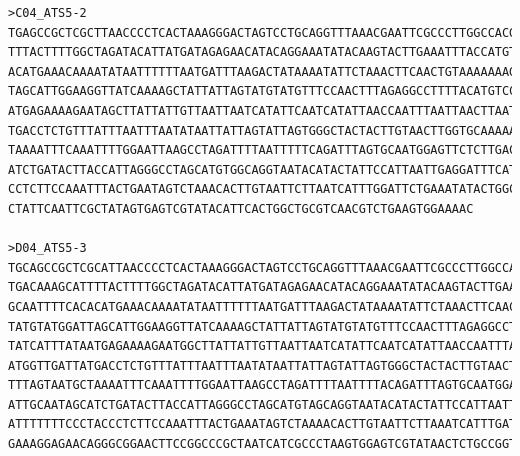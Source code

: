\begin{verbatim}
>C04_ATS5-2
TGAGCCGCTCGCTTAACCCCTCACTAAAGGGACTAGTCCTGCAGGTTTAAACGAATTCGCCCTTGGCCACGCGTCGACTAGTACTTTTTTTTTTTTTTTTTTTTTAAGGTGACAAAGCAT
TTTACTTTTGGCTAGATACATTATGATAGAGAACATACAGGAAATATACAAGTACTTGAAATTTACCATGTTACATTAGAAATTATGGACATAGACATTTAAGTTTTATGCAATTTTCAC
ACATGAAACAAAATATAATTTTTTAATGATTTAAGACTATAAAATATTCTAAACTTCAACTGTAAAAAAAGTAGATTTGACACATGAGGTATGATTTAGTGACCAGTCCTATGTATGGAT
TAGCATTGGAAGGTTATCAAAAGCTATTATTAGTATGTATGTTTCCAACTTTAGAGGCCTTTTACATGTCCTTAATGAATTTATATGCCCTGCATTTGGCATTCAATGGTATCATTTATA
ATGAGAAAAGAATAGCTTATTATTGTTAATTAATCATATTCAATCATATTAACCAATTTAATTAACTTAATATTAATAAACGCACATTAATCAAATTAGTCAACTTAATATGGTTGATTA
TGACCTCTGTTTATTTAATTTAATATAATTATTAGTATTAGTGGGCTACTACTTGTAACTTGGTGCAAAAAAGCTGGTCAGTTTCAAACATTTTCTCTGCTGTCTCCCCTTTAGTAATGC
TAAAATTTCAAATTTTGGAATTAAGCCTAGATTTTAATTTTTCAGATTTAGTGCAATGGAGTTCTCTTGACCAAGTCATATACTCATGCAAATGATAGAAATTATAGCAATTGCAATAGC
ATCTGATACTTACCATTAGGGCCTAGCATGTGGCAGGTAATACATACTATTCCATTAATTGAGGATTTCATATATGATACAATGCATTTTGCTCATCTTCACCTCCCTATTTTTTTCCTA
CCTCTTCCAAATTTACTGAATAGTCTAAACACTTGTAATTCTTAATCATTTGGATTCTGAAATATACTGGCATCCTTAGAATGAGAGCTGAGACACAGAAGAGACAGGCCGATCGCGCCG
CTATTCAATTCGCTATAGTGAGTCGTATACATTCACTGGCTGCGTCAACGTCTGAAGTGGAAAAC

>D04_ATS5-3
TGCAGCCGCTCGCATTAACCCCTCACTAAAGGGACTAGTCCTGCAGGTTTAAACGAATTCGCCCTTGGCCACGCGTCGACTAGTACTTTTTTTTTTTTTTTTTTTTTTTTTTTTTTAAGG
TGACAAAGCATTTTACTTTTGGCTAGATACATTATGATAGAGAACATACAGGAAATATACAAGTACTTGAAATTTACCATGTTACATTAGAAATTATGGACATAGACATTTAAGTTTTAT
GCAATTTTCACACATGAAACAAAATATAATTTTTTAATGATTTAAGACTATAAAATATTCTAAACTTCAACTGTAAAAAAAGTAGATTTGACACATGAGGTATGATTTAGTGACCAGTCC
TATGTATGGATTAGCATTGGAAGGTTATCAAAAGCTATTATTAGTATGTATGTTTCCAACTTTAGAGGCCTTTTACATGTCCTTAATGAATTTATATGCCCTGCATTTGGCATTCAATGG
TATCATTTATAATGAGAAAAGAATGGCTTATTATTGTTAATTAATCATATTCAATCATATTAACCAATTTAATTAACTTAATATTAATAAACGCACATTAATCAAATTAGTCAACTTAAT
ATGGTTGATTATGACCTCTGTTTATTTAATTTAATATAATTATTAGTATTAGTGGGCTACTACTTGTAACTTGGTGCAAAAAAGCTGGTCAGTTTCAAACATTTTCTCTGCTGTCTCCCC
TTTAGTAATGCTAAAATTTCAAATTTTGGAATTAAGCCTAGATTTTAATTTTACAGATTTAGTGCAATGGAGTTCTCTTGACCAAGTCATATACTCATGCAAATGATAGAAATTATAGCA
ATTGCAATAGCATCTGATACTTACCATTAGGGCCTAGCATGTAGCAGGTAATACATACTATTCCATTAATTGGAGGATTTCATATATGATACAATGCATTTTGCTCATCTTCACCCTCCT
ATTTTTTTCCCTACCCTCTTCCAAATTTACTGAAATAGTCTAAAACACTTGTAATTCTTAAATCATTTGATTCTGAAATATACTGGGCATCCTTAGGGATGGAGGGAAGCTGGAACCACA
GAAAGGAGAACAGGGCGGAACTTCCGGCCCGCTAATCATCGCCCTAAGTGGAGTCGTATAACTCTGCCGGTCGATTACACACGCGTCCTGC


\end{verbatim}
